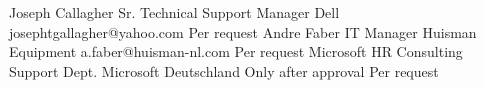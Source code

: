 %
%
%


\begin{referees}
		{Joseph Callagher}
		{Sr. Technical Support Manager}
		{Dell}
		{josephtgallagher@yahoo.com}
		{Per request}
		{Andre Faber}
		{IT Manager}
		{Huisman Equipment}
		{a.faber@huisman-nl.com}
		{Per request}
		{Microsoft HR Consulting}
		{Support Dept.}
		{Microsoft Deutschland}
		{Only after approval}
		{Per request}
\end{referees}
